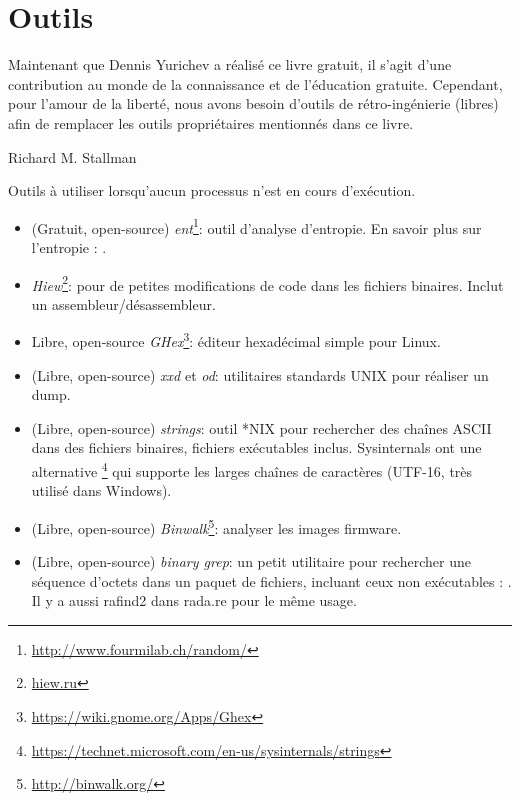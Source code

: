 \chapter{Outils}

\epigraph{Maintenant que Dennis Yurichev a réalisé ce livre gratuit, il s'agit d'une contribution au monde de la connaissance et de l'éducation gratuite.
Cependant, pour l'amour de la liberté, nous avons besoin d'outils de rétro-ingénierie (libres) afin de remplacer les outils propriétaires mentionnés dans ce livre.}{Richard M. Stallman}


Outils à utiliser lorsqu'aucun processus n'est en cours d'exécution.


\begin{itemize}
\item
(Gratuit, open-source) \emph{ent}\footnote{\url{http://www.fourmilab.ch/random/}}: outil d'analyse d'entropie.
En savoir plus sur l'entropie : .

\item
\label{Hiew}
\emph{Hiew}\footnote{\href{http://www.hiew.ru/}{hiew.ru}}:
pour de petites modifications de code dans les fichiers binaires.
Inclut un assembleur/désassembleur.

\item {Libre, open-source} \emph{GHex}\footnote{\url{https://wiki.gnome.org/Apps/Ghex}}: éditeur
hexadécimal simple pour Linux.

\item (Libre, open-source) \emph{xxd} et \emph{od}: utilitaires standards UNIX pour réaliser un dump.

\item (Libre, open-source) \emph{strings}: outil *NIX pour rechercher des chaînes ASCII dans des fichiers binaires, fichiers exécutables inclus.
Sysinternals ont une alternative \footnote{\url{https://technet.microsoft.com/en-us/sysinternals/strings}}
qui supporte les larges chaînes de caractères (UTF-16, très utilisé dans Windows).

\item (Libre, open-source) \emph{Binwalk}\footnote{\url{http://binwalk.org/}}: analyser les images firmware.

\item
{}
(Libre, open-source) \emph{binary grep}:
un petit utilitaire pour rechercher une séquence d'octets dans un paquet de fichiers,
incluant ceux non exécutables : \BGREPURL.
Il y a aussi rafind2 dans rada.re pour le même usage.
\end{itemize}

